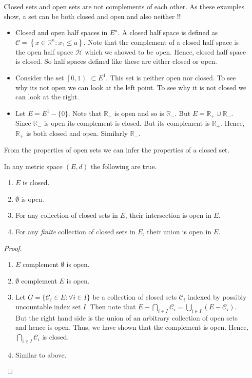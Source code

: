 Closed sets and open sets are not complements of each other. As these examples show, a set can be 
both closed and open and also neither !!
\begin{itemize}
    \item Closed and open half spaces in $E^n$. A closed half space is defined as 
	$\mathcal{C} = \left\lbrace x \in \mathbb{R}^n : x_1 \leq a \right\rbrace$. Note that the
	complement of a closed half space is the open half space $\mathcal{H}$ which we showed to be
	open. Hence, closed half space is closed. So half spaces defined like these are either 
	closed or open.
    \item Consider the set $\left[ 0 , 1\right)$ $\subset E^1$. This set is neither open nor closed.
	To see why its not open we can look at the left point. To see why it is not closed we can
	look at the right.
    \item Let $E = E^1 - \lbrace 0 \rbrace$. Note that $\mathbb{R}_+ $ is open and so is 
	$\mathbb{R}_{-}$. But $E = \mathbb{R}_+ \cup \mathbb{R}_{-}$. Since $\mathbb{R}_{-}$ is open
	its complement is closed. But its complement is $\mathbb{R}_+$. Hence, $\mathbb{R}_+$ is
	both closed and open. Similarly $\mathbb{R}_{-}$.
\end{itemize}
From the properties of open sets we can infer the properties of a closed set.
\begin{Theorem}[name=Properties of closed sets]
    In any metric space $(E,d)$ the following are true.    
    \begin{enumerate}
	\item $E$ is closed.
	\item $\emptyset$ is open.
	\item For any collection of closed sets in $E$, their intersection is open in $E$.
	\item For any \emph{finite} collection of closed sets in $E$, their union is open in 
	    $E$.
    \end{enumerate}
\end{Theorem}
\begin{proof}
    \begin{enumerate}
	\item $E$ complement $\emptyset$ is open.
	\item $\emptyset$ complement $E$ is open.
	\item Let $G = \left.\lbrace \mathcal{C}_i \in E : \forall i \in I \rbrace\right.$ be a
	    collection of closed sets $\mathcal{C}_i$ indexed by possibly uncountable index set $I$.
	    Then note that $E - \bigcap_{i \in I}\mathcal{C}_i = \bigcup_{i \in I}\left(E - 
		\mathcal{C}_i\right)$. But the right hand side is the union of an arbitrary
	    collection of open sets and hence is open. Thus, we have shown that the complement is
	    open. Hence, $\bigcap_{i \in I}\mathcal{C}_i$ is closed. 
	\item Similar to above.
    \end{enumerate}
\end{proof}
